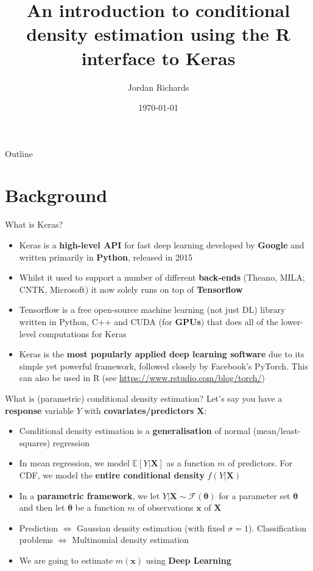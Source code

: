 \documentclass{beamer}
\title[cde-Rkeras-intro]{An introduction to conditional density estimation using the R interface to Keras
}
\author[Jordan Richards]{Jordan Richards}
\institute[KAUST]{King Abdullah University of Science and Technology (KAUST)}
\date{\today}
\begin{document}
\maketitle
\begin{frame}{Outline}
\tableofcontents
\end{frame}
\section{Background}
\begin{frame}{What is Keras?}
\begin{itemize}
\item Keras is a \textbf{high-level API} for fast deep learning developed by \textbf{Google} and written primarily in \textbf{Python}, released in 2015
\item Whilst it used to support a number of different \textbf{back-ends} (Theano, MILA; CNTK, Microsoft) it now solely runs on top of \textbf{Tensorflow}
\item Tensorflow is a free open-source machine learning (not just DL) library written in Python, C++ and CUDA (for \textbf{GPUs}) that does all of the lower-level computations for Keras
\item Keras is the \textbf{most popularly applied deep learning software} due to its simple yet powerful framework, followed closely by Facebook's PyTorch. This can also be used in R (see \url{https://www.rstudio.com/blog/torch/})
\end{itemize}

\end{frame}
\begin{frame}{What is (parametric) conditional density estimation?}
Let's say you have a \textbf{response} variable $Y$ with \textbf{covariates/predictors} $\mathbf{X}$:
\begin{itemize}
\item Conditional density estimation is a \textbf{generalisation} of normal (mean/least-squares) regression
\item In mean regression, we model $\mathbb{E}[Y|\mathbf{X}]$ as a function $m$ of predictors. For CDF, we model the \textbf{entire conditional density} $f(Y|\mathbf{X})$
\item In a \textbf{parametric framework}, we let $Y|\mathbf{X}\sim \mathcal{F}(\boldsymbol{\theta})$ for a parameter set $\boldsymbol{\theta}$ and then let $\boldsymbol{\theta}$ be a function $m$ of observations $\mathbf{x}$ of $\mathbf{X}$
\item Prediction $\Leftrightarrow$ Gaussian density estimation (with fixed $\sigma=1$). Classification problems $\Leftrightarrow$ Multinomial density estimation
\item We are going to estimate $m(\mathbf{x})$ using \textbf{Deep Learning}
\end{itemize}
\end{frame}
\end{document}
